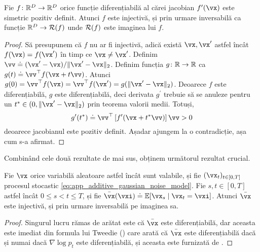 \documentclass[../../book-main_ro.tex]{subfiles}
\begin{document}
\begin{lemma}\label{lem:gribonval_A2}
    Fie \(f \colon \mathbb{R}^{D} \to \mathbb{R}^{D}\) orice funcție diferențiabilă al cărei jacobian \(f^{\prime}(\vx)\) este simetric pozitiv definit. Atunci \(f\) este injectivă, și prin urmare inversabilă ca funcție \(\mathbb{R}^{D} \to \mathcal{R}(f)\) unde \(\mathcal{R}(f)\) este imaginea lui \(f\).
\end{lemma}
\begin{proof}
    Să presupunem că \(f\) nu ar fi injectivă, adică există \(\vx, \vx^{\prime}\) astfel încât \(f(\vx) = f(\vx^{\prime})\) în timp ce \(\vx \neq \vx^{\prime}\). Definim \(\vv \doteq (\vx^{\prime} - \vx)/\norm{\vx^{\prime} - \vx}_{2}\). Definim funcția \(g \colon \mathbb{R} \to \mathbb{R}\) ca \(g(t) \doteq \vv^{\top}f(\vx + t\vv)\). Atunci \(g(0) = \vv^{\top}f(\vx) = \vv^{\top}f(\vx^{\prime}) = g(\norm{\vx^{\prime} - \vx}_{2})\). Deoarece \(f\) este diferențiabilă, \(g\) este diferențiabilă, deci derivata \(g^{\prime}\) trebuie să se anuleze pentru un \(t^{\ast} \in (0, \norm{\vx^{\prime} - \vx}_{2})\) prin teorema valorii medii. Totuși,
    \begin{equation}
        g^{\prime}(t^{\ast}) \doteq \vv^{\top}\bs{f^{\prime}(\vx + t^{\ast}\vv)}\vv > 0
    \end{equation}
    deoarece jacobianul este pozitiv definit. Așadar ajungem la o contradicție, așa cum s-a afirmat.
\end{proof}

Combinând cele două rezultate de mai sus, obținem următorul rezultat crucial.

\begin{corollary}\label{cor:gribonval_A2}
    Fie \(\vx\) orice variabilă aleatoare astfel încât  sunt valabile, și fie \((\vx_{t})_{t \in [0, T]}\) procesul stocastic \eqref{eq:app_additive_gaussian_noise_model}. Fie \(s, t \in [0, T]\) astfel încât \(0 \leq s < t \leq T\), și fie \(\bar{\vx}(\vxi) \doteq \Ex[\vx_{s} \mid \vx_{t} = \vxi]\). Atunci \(\bar{\vx}\) este injectivă, și prin urmare inversabilă pe imaginea sa.
\end{corollary}
\begin{proof}
    Singurul lucru rămas de arătat este că \(\bar{\vx}\) este diferențiabilă, dar aceasta este imediat din formula lui Tweedie () care arată că \(\bar{\vx}\) este diferențiabilă dacă și numai dacă \(\nabla \log p_{t}\) este diferențiabilă, și aceasta este furnizată de .
\end{proof}
\end{document}
